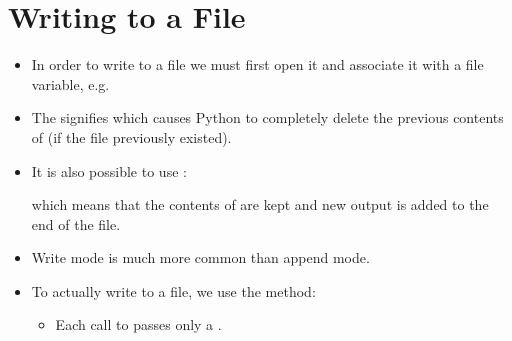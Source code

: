 \documentclass[letterpaper,10pt,english]{sphinxmanual}
\begin{document}
\section{Writing to a File}
\label{\detokenize{lecture_notes/lec13_files_web:writing-to-a-file}}\begin{itemize}
\item {} 
In order to write to a file we must first open it and associate it
with a file variable, e.g.

%
\begin{sphinxVerbatim}[commandchars=\\\{\}]
  
\end{sphinxVerbatim}

\item {} 
The  signifies  which causes Python to completely
delete the previous contents of  (if the file
previously existed).

\item {} 
It is also possible to use :

%
\begin{sphinxVerbatim}[commandchars=\\\{\}]
  
\end{sphinxVerbatim}

which means that the contents of  are kept and new
output is added to the end of the file.

\item {} 
Write mode is much more common than append mode.

\item {} 
To actually write to a file, we use the  method:

%
\begin{sphinxVerbatim}[commandchars=\\\{\}]
\end{sphinxVerbatim}
\begin{itemize}
\item {} 
Each call to  passes only a .


\end{itemize}
\end{itemize}
\end{document}
